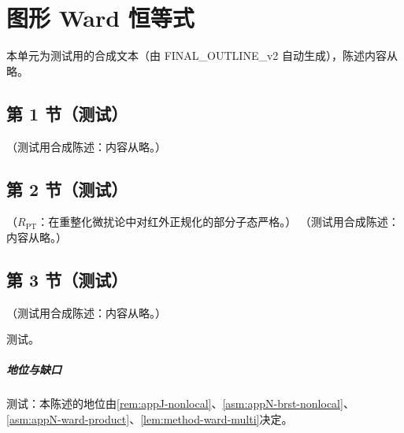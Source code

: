 \chapter{图形 Ward 恒等式}\label{app:appF}
本单元为测试用的合成文本（由 FINAL\_OUTLINE\_v2 自动生成），陈述内容从略。

\section{第 1 节（测试）}\label{sec:appF-one}

\begin{example}\label{ex:appF-telescoping}
（测试用合成陈述：内容从略。）
\end{example}

\section{第 2 节（测试）}\label{sec:appF-two}

\begin{proposition}\label{prop:appF-two-gluon}
（$R_{\mathrm{PT}}$：在重整化微扰论中对红外正规化的部分子态严格。）
（测试用合成陈述：内容从略。）
\end{proposition}

\section{第 3 节（测试）}\label{sec:appF-induction}

\begin{proposition}\label{prop:appF-induction}
（测试用合成陈述：内容从略。）
\end{proposition}
\begin{proofsketch}测试。\end{proofsketch}
\paragraph{地位与缺口}测试：本陈述的地位由\cref{rem:appJ-nonlocal}、\cref{asm:appN-brst-nonlocal}、\cref{asm:appN-ward-product}、\cref{lem:method-ward-multi}决定。
